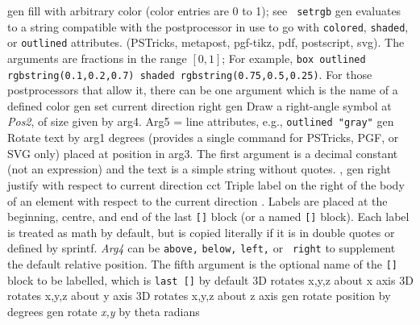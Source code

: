   {gen}
  {fill with arbitrary color (color entries are 0 to 1); see {\tt
   setrgb}}
  {gen}
  {evaluates to a string compatible with the postprocessor in use
   to go with {\tt colored}, {\tt shaded}, or {\tt outlined} attributes.
   (PSTricks, metapost, pgf-tikz, pdf, postscript, svg).  The arguments
   are fractions in the range $[0,1]$; For example, {\tt box outlined
   rgbstring(0.1,0.2,0.7) shaded rgbstring(0.75,0.5,0.25)}.  For those
   postprocessors that allow it, there can be one argument which is the
   name of a defined color}
  {gen}
  {set current direction right }
 {gen}
  {Draw a right-angle symbol at {\sl Pos2}, of size
  given by arg4. Arg5 =
   line attributes, e.g., {\tt outlined "gray"}}
  {gen}
  {Rotate text by arg1 degrees (provides a single command for
   PSTricks, PGF, or SVG only) placed at position in arg3.
   The first argument is a decimal constant (not an expression) and
   the text is a simple string without quotes.
   , }
  {gen}
  {right justify with respect to current direction}
  {cct}
  {Triple label on the right of the body of an element with respect to the
    current direction .  Labels are placed at the
    beginning, centre, and end of the last {\tt []} block (or a named
    {\tt []} block). Each label is treated as math by default, but is
    copied literally if it is in double quotes or defined by sprintf.
    {\sl Arg4} can be {\tt above,} {\tt below,} {\tt left,} or {\tt
    right} to supplement the default relative position.  The fifth
    argument is the optional name of the {\tt []} block to be labelled,
    which is {\tt last []} by default}
  {3D} {rotates x,y,z about x axis}
  {3D} {rotates x,y,z about y axis}
  {3D} {rotates x,y,z about z axis}
  {gen}
  {rotate position by degrees}
  {gen}
  {rotate {\sl x,y} by theta radians}
